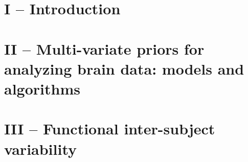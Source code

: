 \documentclass[nobib, a4paper, notoc, twoside, justified, openany]{tufte-book}
\newtheorem{theorem}{Theorem}
\DeclareMathOperator{\dom}{dom}
\DeclareMathOperator{\conv}{conv}
\DeclareMathOperator{\inte}{int }
\begin{document}



\part{\Huge{I -- Introduction}}




\part{\Huge{II -- Multi-variate priors for analyzing brain data: models and algorithms}}



\part{\Huge{III -- Functional inter-subject variability}}
\end{document}
